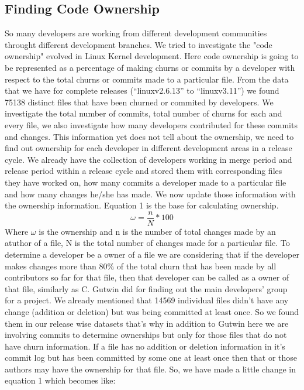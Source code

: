 \documentclass{acm_proc_article-sp}
\begin{document}
\subsection{Finding Code Ownership}
So many developers are working from different development communities throught different development branches. We tried to investigate the "code ownership" \cite{mockus_case_study} evolved in Linux Kernel development. Here code ownership is going to be represented as a percentage of making churns or commits by a developer with respect to the total churns or commits made to a particular file. From the data that we have for complete releases (``linuxv2.6.13'' to ``linuxv3.11'') we found 75138 distinct files that have been churned or commited by developers. We investigate the total number of commits, total number of churns for each and every file, we also investigate how many developers contributed for these commits and changes. This information yet does not tell about the ownership, we need to find out ownership for each developer in different development areas in a release cycle. We already have the collection of developers working in merge period and release period within a release cycle and stored them with corresponding files they have worked on, how many commits a developer made to a particular file and how many changes he/she has made. We now update those information with the ownership information. Equation 1 is the base for calculating ownership.
\begin{equation}\omega=\frac{n}{N}*100\end{equation}
Where $\omega$ is the ownership and n is the number of total changes made by an atuthor of a file, N is the total number of changes made for a particular file.
To determine a developer be a owner of a file we are considering that if the developer makes changes more than 80\% of the total churn that has been made by all contributors so far for that file, then that developer can be called as a owner of that file, similarly as C. Gutwin did \cite{gutwin_awareness} for finding out the main developers' group for a project. We already mentioned that 14569 individual files didn't have any change (addition or deletion) but was being committed at least once. So we found them in our release wise datasets that's why in addition to Gutwin here we are involving commits to determine ownerships but only for those files that do not have churn information. If a file has no addition or deletion information in it's commit log but has been committed by some one at least once then that or those authors may have the ownership for that file. So, we have made a little change in equation 1 which becomes like:
\end{document}
